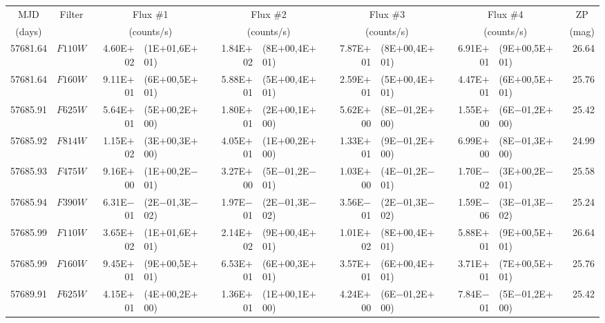 \begin{tabular}{r c r @{\hspace{0.5em}} l r @{\hspace{0.5em}} l r @{\hspace{0.5em}} l r @{\hspace{0.5em}} l r}
\hline\hline
\multicolumn{1}{c}{MJD} & \multicolumn{1}{c}{Filter} & \multicolumn{2}{c}{Flux \#1} & \multicolumn{2}{c}{Flux \#2} & \multicolumn{2}{c}{Flux \#3} & \multicolumn{2}{c}{Flux \#4} & \multicolumn{1}{c}{ZP}\\
\multicolumn{1}{c}{(days)} & & \multicolumn{2}{c}{(counts/s)} & \multicolumn{2}{c}{(counts/s)} & \multicolumn{2}{c}{(counts/s)} & \multicolumn{2}{c}{(counts/s)} & \multicolumn{1}{c}{(mag)}\\
\hline
57681.64 & $F110W$ & 4.60E$+$02 & (1E$+$01,6E$+$01) & 1.84E$+$02 & (8E$+$00,4E$+$01) & 7.87E$+$01 & (8E$+$00,4E$+$01) & 6.91E$+$01 & (9E$+$00,5E$+$01) & 26.64\\
57681.64 & $F160W$ & 9.11E$+$01 & (6E$+$00,5E$+$01) & 5.88E$+$01 & (5E$+$00,4E$+$01) & 2.59E$+$01 & (5E$+$00,4E$+$01) & 4.47E$+$01 & (6E$+$00,5E$+$01) & 25.76\\
57685.91 & $F625W$ & 5.64E$+$01 & (5E$+$00,2E$+$00) & 1.80E$+$01 & (2E$+$00,1E$+$00) & 5.62E$+$00 & (8E$-$01,2E$+$00) & 1.55E$+$00 & (6E$-$01,2E$+$00) & 25.42\\
57685.92 & $F814W$ & 1.15E$+$02 & (3E$+$00,3E$+$00) & 4.05E$+$01 & (1E$+$00,2E$+$00) & 1.33E$+$01 & (9E$-$01,2E$+$00) & 6.99E$+$00 & (8E$-$01,3E$+$00) & 24.99\\
57685.93 & $F475W$ & 9.16E$+$00 & (1E$+$00,2E$-$01) & 3.27E$+$00 & (5E$-$01,2E$-$01) & 1.03E$+$00 & (4E$-$01,2E$-$01) & 1.70E$-$02 & (3E$+$00,2E$-$01) & 25.58\\
57685.94 & $F390W$ & 6.31E$-$01 & (2E$-$01,3E$-$02) & 1.97E$-$01 & (2E$-$01,3E$-$02) & 3.56E$-$01 & (2E$-$01,3E$-$02) & 1.59E$-$06 & (3E$-$01,3E$-$02) & 25.24\\
57685.99 & $F110W$ & 3.65E$+$02 & (1E$+$01,6E$+$01) & 2.14E$+$02 & (9E$+$00,4E$+$01) & 1.01E$+$02 & (8E$+$00,4E$+$01) & 5.88E$+$01 & (9E$+$00,5E$+$01) & 26.64\\
57685.99 & $F160W$ & 9.45E$+$01 & (9E$+$00,5E$+$01) & 6.53E$+$01 & (6E$+$00,3E$+$01) & 3.57E$+$01 & (6E$+$00,4E$+$01) & 3.71E$+$01 & (7E$+$00,5E$+$01) & 25.76\\
57689.91 & $F625W$ & 4.15E$+$01 & (4E$+$00,2E$+$00) & 1.36E$+$01 & (1E$+$00,1E$+$00) & 4.24E$+$00 & (6E$-$01,2E$+$00) & 7.84E$-$01 & (5E$-$01,2E$+$00) & 25.42\\

\end{tabular}
